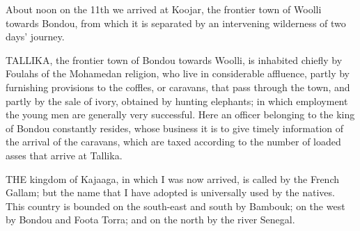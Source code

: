 \documentclass[12pt]{article}
\begin{document}
About noon on the 11th we arrived at Koojar, the frontier town of Woolli towards
Bondou, from which it is separated by an intervening wilderness of two days’
journey.

TALLIKA, the frontier town of Bondou towards Woolli, is inhabited chiefly by
Foulahs of the Mohamedan religion, who live in considerable affluence, partly by
furnishing provisions to the coffles, or caravans, that pass through the town,
and partly by the sale of ivory, obtained by hunting elephants; in which
employment the young men are generally very successful. Here an officer
belonging to the king of Bondou constantly resides, whose business it is to give
timely information of the arrival of the caravans, which are taxed according to
the number of loaded asses that arrive at Tallika.

THE kingdom of Kajaaga, in which I was now arrived, is called by the French
Gallam; but the name that I have adopted is universally used by the natives.
This country is bounded on the south-east and south by Bambouk; on the west by
Bondou and Foota Torra; and on the north by the river Senegal.

\pagebreak



\end{document}
